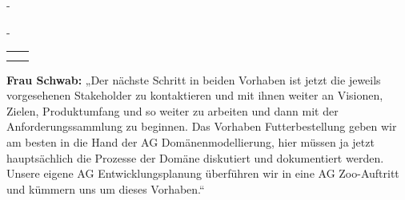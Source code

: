 { %
	\renewcommand{\sttpKarteikarteSkalierungsfaktor}{0.85}

	\begin{addmargin*}[0cm]{-\marginparwidth}
	\begin{addmargin*}[0cm]{-\marginparsep}
	
	\begin{center}
		\begin{tabular}{ p{8.2cm} p{8.2cm} }
			\vspace{-0.5cm}
			\begin{center}
				
			\end{center}
			&
			\vspace{-0.7cm}
			\begin{center}
				
			\end{center}
			\\
			\vspace{-0.5cm}
			\begin{center}
				
			\end{center}
			&
			\vspace{-0.5cm}
			\begin{center}
				
			\end{center}
			\\
		\end{tabular}
	\end{center}

	\end{addmargin*}
	\end{addmargin*}
} %

\textbf{Frau Schwab:} „Der nächste Schritt in beiden Vorhaben ist jetzt die jeweils vorgesehenen Stakeholder zu kontaktieren und mit ihnen weiter an Visionen, Zielen, Produkt\-umfang und so weiter zu arbeiten und dann mit der Anforderungs\-sammlung zu beginnen. Das Vorhaben Futterbestellung geben wir am besten in die Hand der AG Domänenmodellierung, hier müssen ja jetzt hauptsächlich die Prozesse der \mbox{Domäne} diskutiert und dokumentiert werden. Unsere eigene AG Entwicklungs\-planung überführen wir in eine AG Zoo-Auftritt und kümmern uns um dieses Vorhaben.“